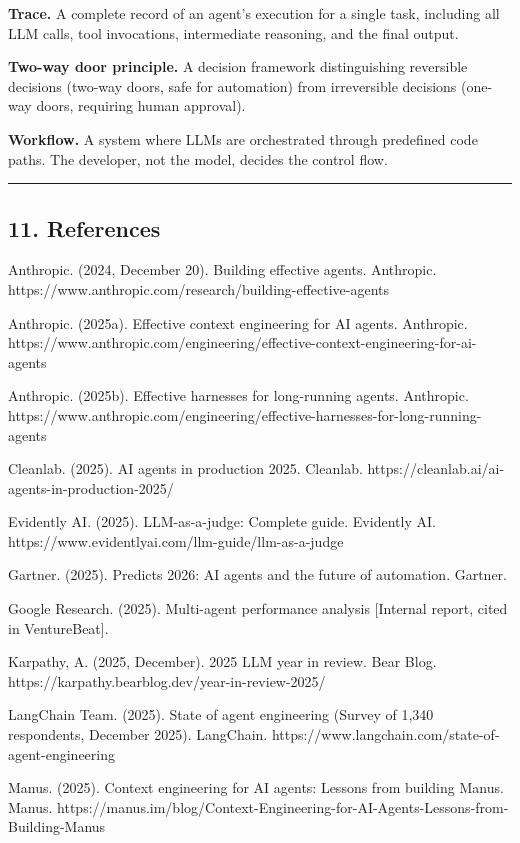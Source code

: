 \documentclass[11pt, a4paper]{article}
\begin{document}
\textbf{Trace.} A complete record of an agent's execution for a single
task, including all LLM calls, tool invocations, intermediate reasoning,
and the final output.

\textbf{Two-way door principle.} A decision framework distinguishing
reversible decisions (two-way doors, safe for automation) from
irreversible decisions (one-way doors, requiring human approval).

\textbf{Workflow.} A system where LLMs are orchestrated through
predefined code paths. The developer, not the model, decides the control
flow.

\begin{center}\rule{0.5\linewidth}{0.5pt}\end{center}

\hypertarget{references}{%
\subsection{11. References}\label{references}}

Anthropic. (2024, December 20). Building effective agents. Anthropic.
https://www.anthropic.com/research/building-effective-agents

Anthropic. (2025a). Effective context engineering for AI agents.
Anthropic.
https://www.anthropic.com/engineering/effective-context-engineering-for-ai-agents

Anthropic. (2025b). Effective harnesses for long-running agents.
Anthropic.
https://www.anthropic.com/engineering/effective-harnesses-for-long-running-agents

Cleanlab. (2025). AI agents in production 2025. Cleanlab.
https://cleanlab.ai/ai-agents-in-production-2025/

Evidently AI. (2025). LLM-as-a-judge: Complete guide. Evidently AI.
https://www.evidentlyai.com/llm-guide/llm-as-a-judge

Gartner. (2025). Predicts 2026: AI agents and the future of automation.
Gartner.

Google Research. (2025). Multi-agent performance analysis {[}Internal
report, cited in VentureBeat{]}.

Karpathy, A. (2025, December). 2025 LLM year in review. Bear Blog.
https://karpathy.bearblog.dev/year-in-review-2025/

LangChain Team. (2025). State of agent engineering (Survey of 1,340
respondents, December 2025). LangChain.
https://www.langchain.com/state-of-agent-engineering

Manus. (2025). Context engineering for AI agents: Lessons from building
Manus. Manus.
https://manus.im/blog/Context-Engineering-for-AI-Agents-Lessons-from-Building-Manus
\end{document}
